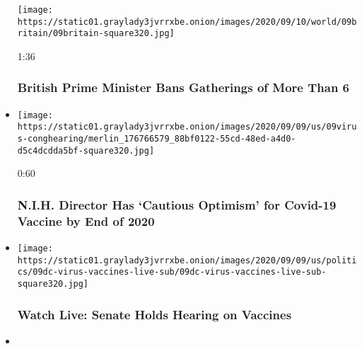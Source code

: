 \begin{itemize}
  \texttt{[image: https://static01.graylady3jvrrxbe.onion/images/2020/09/10/world/09britain/09britain-square320.jpg]}

  1:36

  \hypertarget{british-prime-minister-bans-gatherings-of-more-than-6}{%
  \subsubsection{British Prime Minister Bans Gatherings of More Than
  6}\label{british-prime-minister-bans-gatherings-of-more-than-6}}
\item
  \href{https://www.nytimes3xbfgragh.onion/video/us/politics/100000007331800/nih-collins-coronavirus-vaccine.html?action=click\&module=video-series-bar\&region=header\&pgtype=Article\&playlistId=video/coronavirus-news-update}{}

  \texttt{[image: https://static01.graylady3jvrrxbe.onion/images/2020/09/09/us/09virus-conghearing/merlin\_176766579\_88bf0122-55cd-48ed-a4d0-d5c4dcdda5bf-square320.jpg]}

  0:60

  \hypertarget{nih-director-has-cautious-optimism-for-covid-19-vaccine-by-end-of-2020}{%
  \subsubsection{N.I.H. Director Has `Cautious Optimism' for Covid-19
  Vaccine by End of
  2020}\label{nih-director-has-cautious-optimism-for-covid-19-vaccine-by-end-of-2020}}
\item
  \href{https://www.nytimes3xbfgragh.onion/video/us/politics/100000007331279/senate-vaccine-hearing.html?action=click\&module=video-series-bar\&region=header\&pgtype=Article\&playlistId=video/coronavirus-news-update}{}

  \texttt{[image: https://static01.graylady3jvrrxbe.onion/images/2020/09/09/us/politics/09dc-virus-vaccines-live-sub/09dc-virus-vaccines-live-sub-square320.jpg]}

  \hypertarget{watch-live-senate-holds-hearing-on-vaccines}{%
  \subsubsection{Watch Live: Senate Holds Hearing on
  Vaccines}\label{watch-live-senate-holds-hearing-on-vaccines}}
\item
  \href{https://www.nytimes3xbfgragh.onion/video/us/politics/100000007328380/biden-coronavirus-vaccine.html?action=click\&module=video-series-bar\&region=header\&pgtype=Article\&playlistId=video/coronavirus-news-update}{}


\end{itemize}
